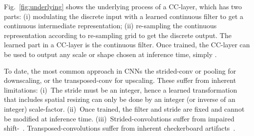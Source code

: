 Fig.~\ref{fig:underlying} shows the underlying process of a CC-layer, which has two parts: (i) modulating the discrete input with a learned continuous filter to get a continuous intermediate representation; (ii) re-sampling the continuous representation according to  re-sampling grid to get the discrete output. The  learned part in a CC-layer is the continuous filter. Once trained, the CC-layer can be used to output any scale or shape chosen at inference time, simply .


To date, the most common approach   in CNNs  the strided-conv or pooling for  downscaling, or the transposed-conv for upscaling. These suffer from inherent limitations: (i)~The stride must be an integer, hence a learned transformation that includes spatial resizing can only be done by an integer (or inverse of an integer) scale-factor. (ii)~Once trained, the filter and stride are fixed and cannot be modified at inference time. (iii)~Strided-convolutions suffer from impaired shift-~\cite{zhang2019shiftinvar, azulay2018deep}. Transposed-convolutions suffer from inherent checkerboard artifacts~\cite{odena2016deconvolution}.

